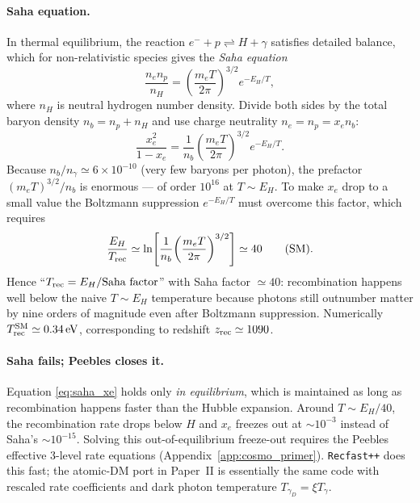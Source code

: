 \documentclass[12pt]{article}
\newcommand{\gD}{\gamma_D}
\newcommand{\eV}{\,\mathrm{eV}}
\begin{document}
\paragraph{Saha equation.}  In thermal equilibrium, the reaction
$e^- + p \rightleftharpoons H + \gamma$ satisfies detailed balance,
which for non-relativistic species gives the \emph{Saha equation}
%
\begin{equation}
  \frac{n_e n_p}{n_H}
    = \left(\frac{m_e T}{2\pi}\right)^{3/2}
      e^{-E_H/T},
  \label{eq:saha_dm}
\end{equation}
%
where $n_H$ is neutral hydrogen number density.  Divide both sides by
the total baryon density $n_b = n_p + n_H$ and use charge neutrality
$n_e = n_p = x_e n_b$:
%
\begin{equation}
  \frac{x_e^2}{1-x_e}
    = \frac{1}{n_b}\!\left(\frac{m_e T}{2\pi}\right)^{3/2}\!
      e^{-E_H/T}.
  \label{eq:saha_xe}
\end{equation}
%
Because $n_b/n_\gamma \simeq 6\times 10^{-10}$ (very few baryons per
photon), the prefactor $(m_e T)^{3/2}/n_b$ is enormous --- of order
$10^{16}$ at $T\sim E_H$.  To make $x_e$ drop to a small value the
Boltzmann suppression $e^{-E_H/T}$ must overcome this factor, which
requires
%
\begin{equation}
  \frac{E_H}{T_{\rm rec}}
    \simeq \ln\!\left[\frac{1}{n_b}\!\left(\frac{m_e T}{2\pi}\right)^{3/2}\right]
    \simeq 40
  \qquad\text{(SM)}.
\end{equation}
%
Hence ``$T_{\rm rec} = E_H / \text{Saha factor}$'' with Saha factor
$\simeq 40$: recombination happens well below the naive $T\sim E_H$
temperature because photons still outnumber matter by nine orders of
magnitude even after Boltzmann suppression.  Numerically
$T_{\rm rec}^{\rm SM}\simeq 0.34\eV$, corresponding to redshift
$z_{\rm rec}\simeq 1090$.

\paragraph{Saha fails; Peebles closes it.}  Equation \eqref{eq:saha_xe}
holds only \emph{in equilibrium}, which is maintained as long as
recombination happens faster than the Hubble expansion.  Around
$T\sim E_H/40$, the recombination rate drops below $H$ and $x_e$
freezes out at $\sim 10^{-3}$ instead of Saha's $\sim 10^{-15}$.
Solving this out-of-equilibrium freeze-out requires the Peebles
effective 3-level rate equations (Appendix~\ref{app:cosmo_primer}).
\texttt{Recfast++} \citep{Seager1999} does this fast; the atomic-DM
port in Paper~II is essentially the same code with rescaled rate
coefficients and dark photon temperature $T_{\gD} = \xi T_\gamma$.
\end{document}
